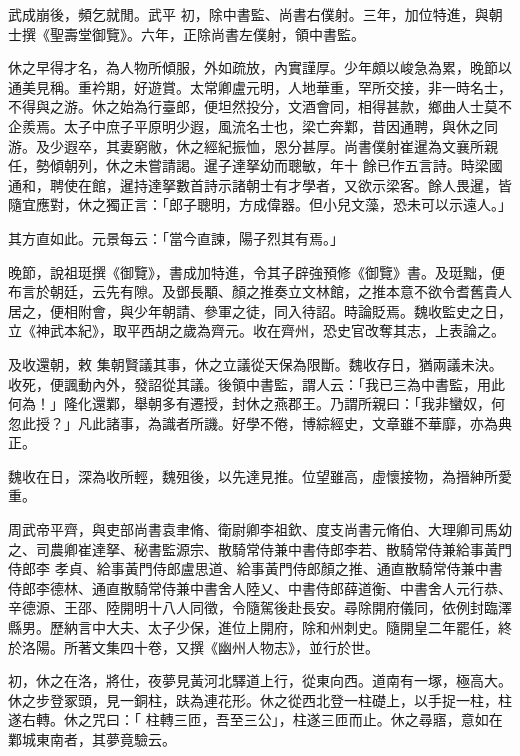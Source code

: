 \begin{pinyinscope}
 武成崩後，頻乞就閒。武平
 初，除中書監、尚書右僕射。三年，加位特進，與朝士撰《聖壽堂御覽》。六年，正除尚書左僕射，領中書監。



 休之早得才名，為人物所傾服，外如疏放，內實謹厚。少年頗以峻急為累，晚節以通美見稱。重衿期，好遊賞。太常卿盧元明，人地華重，罕所交接，非一時名士，不得與之游。休之始為行臺郎，便坦然投分，文酒會同，相得甚款，鄉曲人士莫不企羨焉。太子中庶子平原明少遐，風流名士也，梁亡奔鄴，昔因通聘，與休之同游。及少遐卒，其妻窮敝，休之經紀振恤，恩分甚厚。尚書僕射崔暹為文襄所親任，勢傾朝列，休之未嘗請謁。暹子達拏幼而聰敏，年十
 餘已作五言詩。時梁國通和，聘使在館，暹持達拏數首詩示諸朝士有才學者，又欲示梁客。餘人畏暹，皆隨宜應對，休之獨正言：「郎子聰明，方成偉器。但小兒文藻，恐未可以示遠人。」



 其方直如此。元景每云：「當今直諫，陽子烈其有焉。」



 晚節，說祖珽撰《御覽》，書成加特進，令其子辟強預修《御覽》書。及珽黜，便布言於朝廷，云先有隙。及鄧長顒、顏之推奏立文林館，之推本意不欲令耆舊貴人居之，便相附會，與少年朝請、參軍之徒，同入待詔。時論貶焉。魏收監史之日，立《神武本紀》，取平西胡之歲為齊元。收在齊州，恐史官改奪其志，上表論之。



 及收還朝，敕
 集朝賢議其事，休之立議從天保為限斷。魏收存日，猶兩議未決。收死，便諷動內外，發詔從其議。後領中書監，謂人云：「我已三為中書監，用此何為！」隆化還鄴，舉朝多有遷授，封休之燕郡王。乃謂所親曰：「我非蠻奴，何忽此授？」凡此諸事，為識者所譏。好學不倦，博綜經史，文章雖不華靡，亦為典正。



 魏收在日，深為收所輕，魏殂後，以先達見推。位望雖高，虛懷接物，為搢紳所愛重。



 周武帝平齊，與吏部尚書袁聿脩、衛尉卿李祖欽、度支尚書元脩伯、大理卿司馬幼之、司農卿崔達拏、秘書監源宗、散騎常侍兼中書侍郎李若、散騎常侍兼給事黃門侍郎李
 孝貞、給事黃門侍郎盧思道、給事黃門侍郎顏之推、通直散騎常侍兼中書侍郎李德林、通直散騎常侍兼中書舍人陸乂、中書侍郎薛道衡、中書舍人元行恭、辛德源、王邵、陸開明十八人同徵，令隨駕後赴長安。尋除開府儀同，依例封臨澤縣男。歷納言中大夫、太子少保，進位上開府，除和州刺史。隨開皇二年罷任，終於洛陽。所著文集四十卷，又撰《幽州人物志》，並行於世。



 初，休之在洛，將仕，夜夢見黃河北驛道上行，從東向西。道南有一塚，極高大。休之步登冢頭，見一銅柱，趺為連花形。休之從西北登一柱礎上，以手捉一柱，柱遂右轉。休之咒曰：「
 柱轉三匝，吾至三公」，柱遂三匝而止。休之尋寤，意如在鄴城東南者，其夢竟驗云。




\end{pinyinscope}
